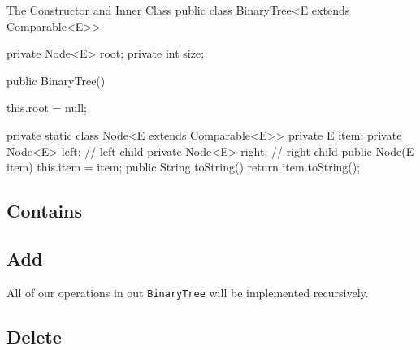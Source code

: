 \begin{javacode}{The Constructor and Inner Class}
public class BinaryTree<E extends Comparable<E>> {
	private Node<E> root;
	private int size;
	
	public BinaryTree() {
		this.root = null;
		
	}
	
	private static class Node<E extends Comparable<E>> {
		private E item;
		private Node<E> left;  // left child
		private Node<E> right; // right child
		public Node(E item) {
			this.item = item;
		}
		public String toString() {
			return item.toString();
		}
	}
	
	
}
\end{javacode}


\subsection{Contains}



\subsection{Add}


All of our operations in out \texttt{BinaryTree} will be implemented recursively.



\subsection{Delete}
